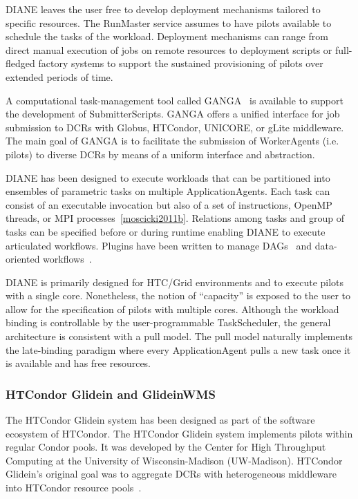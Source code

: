 \documentclass{sig-alternate}
\begin{document}
DIANE leaves the user free to develop deployment mechanisms tailored to specific
resources. The RunMaster service assumes to have pilots available to schedule
the tasks of the workload. Deployment mechanisms can range from direct manual
execution of jobs on remote resources to deployment scripts or full-fledged
factory systems to support the sustained provisioning of pilots over extended
periods of time.

A computational task-management tool called
GANGA~\cite{moscicki2009ganga,ganga_url} is available to support the development
of SubmitterScripts. GANGA offers a unified interface for job submission to DCRs
with Globus, HTCondor, UNICORE, or gLite middleware. The main goal of GANGA is to
facilitate the submission of WorkerAgents (i.e. pilots) to diverse DCRs by means
of a uniform interface and abstraction.

DIANE has been designed to execute workloads that can be partitioned into
ensembles of parametric tasks on multiple ApplicationAgents. Each task can
consist of an executable invocation but also of a set of instructions, OpenMP
threads, or MPI processes~\ref{moscicki2011b}. Relations among tasks and group
of tasks can be specified before or during runtime enabling DIANE to execute
articulated workflows. Plugins have been written to manage
DAGs~\cite{grzeslo2009} and data-oriented workflows~\cite{glatard2008}.

DIANE is primarily designed for HTC/Grid environments and to execute pilots with
a single core. Nonetheless, the notion of ``capacity'' is exposed to the user to
allow for the specification of pilots with multiple cores. Although the workload
binding is controllable by the user-programmable TaskScheduler, the general
architecture is consistent with a pull model. The pull model naturally
implements the late-binding paradigm where every ApplicationAgent pulls a new
task once it is available and has free resources.

%
\subsubsection{HTCondor Glidein and GlideinWMS}
\label{sec:glidein}

The HTCondor Glidein system has been designed as part of the software ecosystem
of HTCondor. The HTCondor Glidein system implements pilots within regular Condor
pools.  It was developed by the Center for High Throughput Computing at the
University of Wisconsin-Madison (UW-Madison).  HTCondor Glidein's original goal
was to aggregate DCRs with heterogeneous middleware into HTCondor resource
pools~\cite{glidein_manual_url}.
\end{document}
